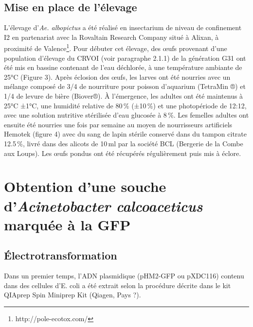 \subsection{Mise en place de l'élevage}

L’élevage d'\textit{Ae. albopictus} a été réalisé en insectarium de niveau de confinement I2 en partenariat avec la Rovaltain Research Company situé à Alixan, à proximité de Valence\footnote{http://pole-ecotox.com/}. Pour débuter cet élevage, des œufs provenant d’une population d’élevage du CRVOI (voir paragraphe 2.1.1) de la génération G31 ont été mis en bassine contenant de l'eau déchlorée, à une température ambiante de 25°C (Figure 3). 
Après éclosion des œufs, les larves ont été nourries avec un mélange composé de 3/4 de nourriture pour poisson d'aquarium (TetraMin ®) et 1/4 de levure de bière (Biover®).
À l'émergence, les adultes ont été maintenus à 25°C ±1°C, une humidité relative de 80\,\% (±10\,\%) et une photopériode de 12:12, avec une solution nutritive stérilisée d'eau glucosée à 8\,\%. Les femelles adultes ont ensuite été nourries une fois par semaine au moyen de nourrisseurs artificiels Hemotek (figure 4) avec du sang de lapin stérile conservé dans du tampon citrate 12.5\,\%, livré dans des alicots de 10\,ml par la société BCL (Bergerie de la Combe aux Loups).
Les œufs pondus ont été récupérés régulièrement puis mis à éclore.

\section{Obtention d'une souche d'\textit{Acinetobacter calcoaceticus} marquée à la GFP}

\subsection{Électrotransformation}

Dans un premier temps, l’ADN plasmidique (pHM2-GFP ou pXDC116) contenu dans des cellules d’E. coli a été extrait selon la procédure décrite dans le kit QIAprep Spin Miniprep Kit (Qiagen, Pays ?).

